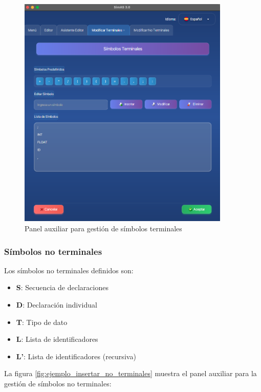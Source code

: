 \needspace{8cm}
\begin{figure}[H]
    \centering
    \includegraphics[width=0.9\textwidth]{figuras/ejemplo_practico/insertar_terminales.png}
    \caption{Panel auxiliar para gestión de símbolos terminales}
    \label{fig:ejemplo_insertar_terminales}
\end{figure}

\subsubsection{Símbolos no terminales}

Los símbolos no terminales definidos son:
\begin{itemize}
    \item \textbf{S}: Secuencia de declaraciones
    \item \textbf{D}: Declaración individual
    \item \textbf{T}: Tipo de dato
    \item \textbf{L}: Lista de identificadores
    \item \textbf{L'}: Lista de identificadores (recursiva)
\end{itemize}

La figura \ref{fig:ejemplo_insertar_no_terminales} muestra el panel auxiliar para la gestión de símbolos no terminales:

